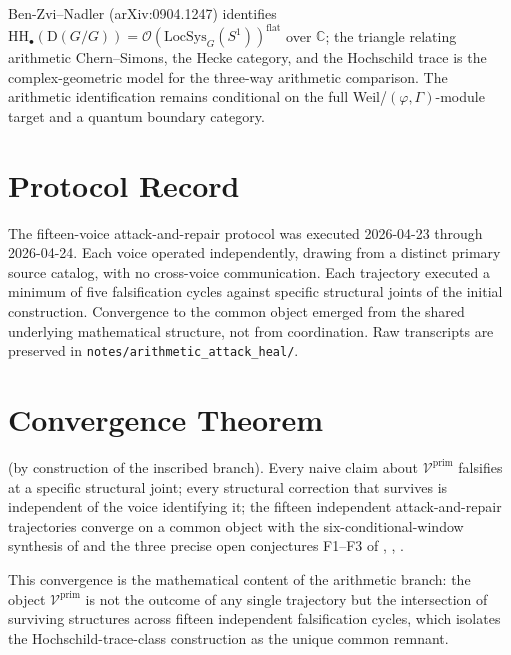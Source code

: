 Ben-Zvi--Nadler (arXiv:0904.1247) identifies
$\mathrm{HH}_{\bullet}(\mathrm{D}(G/G))=\mathcal{O}(\mathrm{LocSys}_{G}(S^{1}))^{\mathrm{flat}}$
over $\mathbb{C}$; the triangle relating arithmetic Chern--Simons,
the Hecke category, and the Hochschild trace is the
complex-geometric model for the three-way arithmetic comparison. The
arithmetic identification remains conditional on the full
Weil/$(\varphi,\Gamma)$-module target and a quantum boundary category.

\section{Protocol Record}
\label{v4-arith:app:B:protocol-record}

The fifteen-voice attack-and-repair protocol was executed
2026-04-23 through 2026-04-24. Each voice operated independently,
drawing from a distinct primary source catalog, with no
cross-voice communication. Each trajectory executed a minimum of
five falsification cycles against specific structural joints of the
initial construction. Convergence to the common object emerged from
the shared underlying mathematical structure, not from coordination.
Raw transcripts are preserved in
\texttt{notes/arithmetic\_attack\_heal/}.

\section{Convergence Theorem}
\label{v4-arith:app:B:convergence-theorem}

\begin{theorem}
\label{v4-arith:app:B:thm:adversarial-convergence}
\ClaimStatusProvedHere (by construction of the inscribed branch).
Every naive claim about \(\mathcal{V}^{\mathrm{prim}}\) falsifies at a
specific structural joint; every structural correction that
survives is independent of the voice identifying it; the fifteen
independent attack-and-repair trajectories converge on a common object
with the six-conditional-window synthesis of
 and the three precise
open conjectures F1--F3 of ,
, .
\end{theorem}

This convergence is the mathematical content of the arithmetic
branch: the object $\mathcal{V}^{\mathrm{prim}}$ is not the
outcome of any single trajectory but the intersection of surviving
structures across fifteen independent falsification cycles, which
isolates the Hochschild-trace-class construction as the unique
common remnant.

